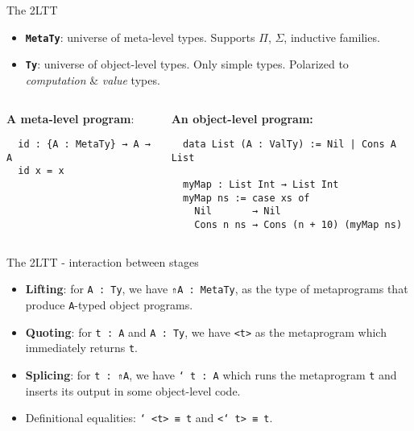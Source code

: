 \documentclass[dvipsnames,aspectratio=169]{beamer}
\newcommand{\ttt}[1]{{\texttt{#1}}}
\theoremstyle{remark}
\begin{document}
\begin{frame}[fragile]{The 2LTT}

\begin{itemize}
  \item \textbf{\ttt{MetaTy}}: universe of meta-level types. Supports $\Pi$, $\Sigma$, inductive families.
  \item \textbf{\ttt{Ty}}: universe of object-level types. Only simple types. Polarized to \emph{computation} \& \emph{value} types.
\end{itemize}
\vspace{2em}

\begin{columns}
\begin{column}{0.4\textwidth}
\textbf{A meta-level program}:
\begin{verbatim}
  id : {A : MetaTy} → A → A
  id x = x




\end{verbatim}
\end{column}

\begin{column}{0.6\textwidth}
\textbf{An object-level program:}
\begin{verbatim}
  data List (A : ValTy) := Nil | Cons A List

  myMap : List Int → List Int
  myMap ns := case xs of
    Nil       → Nil
    Cons n ns → Cons (n + 10) (myMap ns)
\end{verbatim}
\end{column}
\end{columns}


\end{frame}

\begin{frame}[fragile]{The 2LTT - interaction between stages}

\begin{itemize}
\item \textbf{Lifting}: for \ttt{A : Ty}, we have \ttt{⇑A : MetaTy}, as the type of
      metaprograms that produce \ttt{A}-typed object programs.
\item \textbf{Quoting}: for \ttt{t : A} and \ttt{A : Ty}, we have \ttt{<t>} as the metaprogram
      which immediately returns \ttt{t}.
\item \textbf{Splicing}: for \ttt{t : ⇑A}, we have \ttt{\char`~t : A} which runs the
       metaprogram \ttt{t} and inserts its output in some object-level code.
\item Definitional equalities: \ttt{\char`~<t> ≡ t} and \ttt{<\char`~t> ≡ t}.
\end{itemize}

\end{frame}
\end{document}
